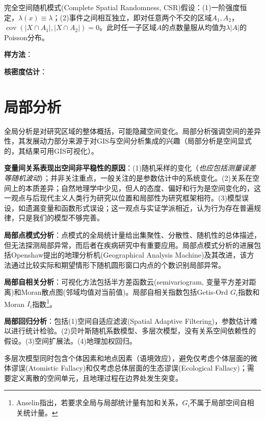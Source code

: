 \par 完全空间随机模式(Complete Spatial Randomness, CSR)假设：(1)一阶强度恒定，$\lambda(x)\equiv \lambda$；(2)事件之间相互独立，即对任意两个不交的区域$A_1,A_2$，$\operatorname{cov}(\vert X\cap A_1\vert,\vert X\cap A_2\vert)=0$。此时任一子区域$A$的点数量服从均值为$\lambda \vert A \vert$的Poisson分布。

\par \textbf{样方法}：

\par \textbf{核密度估计}：

\section{局部分析}

\par 全局分析是对研究区域的整体概括，可能隐藏空间变化。局部分析强调空间的差异性，其发展动力部分来源于对GIS与空间分析集成的兴趣（局部分析是空间显式的，其结果可用GIS可视化）。

\par \textbf{变量间关系表现出空间非平稳性的原因}：(1)随机采样的变化（\emph{也应包括测量误差等随机波动}）；并非关注重点，一般关注的是参数估计中的系统变化。(2)关系在空间上的本质差异；自然地理学中少见，但人的态度、偏好和行为是空间变化的，这一观点与后现代主义人类行为研究以位置和局部性为研究框架相符。(3)模型误设，如遗漏变量和函数形式误设；这一观点与实证学派相近，认为行为存在普遍规律，只是我们的模型不够完善。

\par \textbf{局部点模式分析}：点模式的全局统计量给出集聚性、分散性、随机性的总体描述，但无法探测局部异常，而后者在疾病研究中有重要应用。局部点模式分析的进展包括Openshaw提出的地理分析机(Geographical Analysis Machine)及其改进，该方法通过比较实际和期望情形下随机圆形窗口内点的个数识别局部异常。

\par \textbf{局部自相关分析}：可视化方法包括半方差函数云(semivariogram, 变量平方差对距离)和Moran散点图(邻域均值对当前值)。局部自相关指数包括Getis-Ord $G_i$指数和Moran $I_i$指数\footnote{Anselin指出，若要求全局与局部统计量有加和关系，$G_i$不属于局部空间自相关统计量。}。

\par \textbf{局部回归分析}：包括(1)空间自适应滤波(Spatial Adaptive Filtering)，参数估计难以进行统计检验。(2)贝叶斯随机系数模型、多层次模型，没有关系空间依赖性的假设。(3)空间扩展法。(4)地理加权回归。

\par 多层次模型同时包含个体因素和地点因素（语境效应），避免仅考虑个体层面的微体谬误(Atomistic Fallacy)和仅考虑总体层面的生态谬误(Ecological Fallacy)；需要定义离散的空间单元，且地理过程在边界处发生突变。


